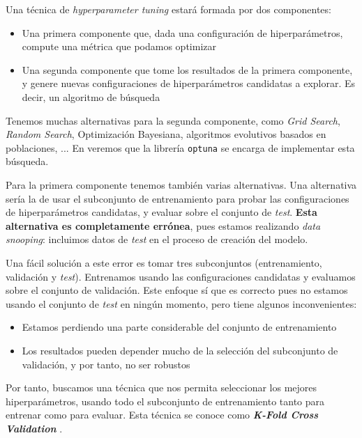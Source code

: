 Una técnica de \textit{hyperparameter tuning} estará formada por dos componentes:

\begin{itemize}
    \item Una primera componente que, dada una configuración de hiperparámetros, compute una métrica que podamos optimizar
    \item Una segunda componente que tome los resultados de la primera componente, y genere nuevas configuraciones de hiperparámetros candidatas a explorar. Es decir, un algoritmo de búsqueda
\end{itemize}

Tenemos muchas alternativas para la segunda componente, como \textit{Grid Search}, \textit{Random Search}, Optimización Bayesiana, algoritmos evolutivos basados en poblaciones, ... \cite{informatica:review_algoritmos_hp} En  veremos que la librería \lstinline{optuna} se encarga de implementar esta búsqueda.

Para la primera componente tenemos también varias alternativas. Una alternativa sería la de usar el subconjunto de entrenamiento para probar las configuraciones de hiperparámetros candidatas, y evaluar sobre el conjunto de \textit{test}. \textbf{Esta alternativa es completamente errónea}, pues estamos realizando \textit{data snooping}: incluimos datos de \textit{test} en el proceso de creación del modelo.

Una fácil solución a este error es tomar tres subconjuntos (entrenamiento, validación y \textit{test}). Entrenamos usando las configuraciones candidatas y evaluamos sobre el conjunto de validación. Este enfoque sí que es correcto pues no estamos usando el conjunto de \textit{test} en ningún momento, pero tiene algunos inconvenientes:

\begin{itemize}
    \item Estamos perdiendo una parte considerable del conjunto de entrenamiento
    \item Los resultados pueden depender mucho de la selección del subconjunto de validación, y por tanto, no ser robustos
\end{itemize}

Por tanto, buscamos una técnica que nos permita seleccionar los mejores hiperparámetros, usando todo el subconjunto de entrenamiento tanto para entrenar como para evaluar. Esta técnica se conoce como \textbf{\textit{K-Fold Cross Validation}} \cite{informatica:kfold_cross_val_paper}.

